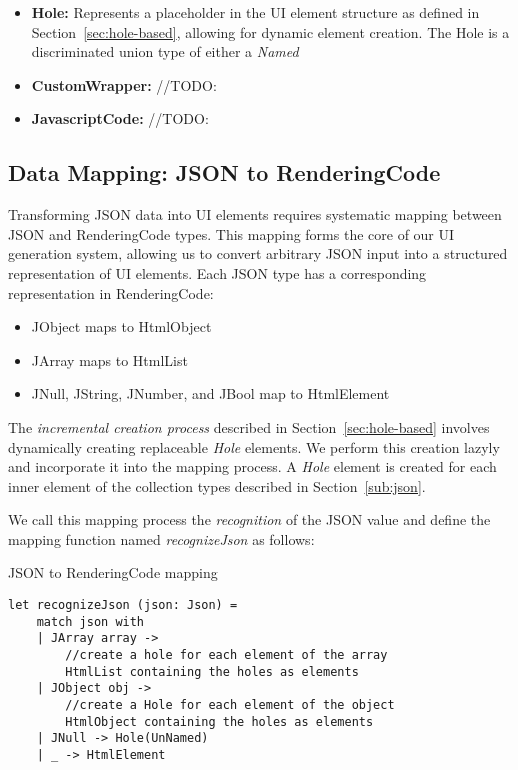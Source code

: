 \begin{itemize}
	\item {\textbf{Hole:} Represents a placeholder in the UI element structure as defined in Section~\ref{sec:hole-based}, allowing for dynamic element creation.
	      The Hole is a discriminated union type of either a \emph{Named}
	      }

	\item {\textbf{CustomWrapper:} //TODO:}

	\item{\textbf{JavascriptCode:} //TODO:}

\end{itemize}


\subsection{Data Mapping: JSON to RenderingCode}
\label{sec:mapping}
Transforming JSON data into UI elements requires systematic mapping between JSON and RenderingCode types.
This mapping forms the core of our UI generation system, allowing us to convert arbitrary JSON input into a structured representation of UI elements.
Each JSON type has a corresponding representation in RenderingCode:
\begin{itemize}
	\item JObject maps to HtmlObject
	\item JArray maps to HtmlList
	\item JNull, JString, JNumber, and JBool map to HtmlElement
\end{itemize}

The \emph{incremental creation process} described in Section~\ref{sec:hole-based} involves dynamically creating replaceable \emph{Hole} elements.
We perform this creation lazyly and incorporate it into the mapping process.
A \emph{Hole} element is created for each inner element of the collection types described in Section~\ref{sub:json}.


We call this mapping process the \emph{recognition} of the JSON value and define the mapping function named \emph{recognizeJson} as follows:

\begin{listing}[h]
	\caption {JSON to RenderingCode mapping}
	\begin{lstlisting}
let recognizeJson (json: Json) =
    match json with
    | JArray array -> 
        //create a hole for each element of the array
        HtmlList containing the holes as elements
    | JObject obj ->
        //create a Hole for each element of the object 
        HtmlObject containing the holes as elements
    | JNull -> Hole(UnNamed)
    | _ -> HtmlElement 
  \end{lstlisting}
\end{listing}

